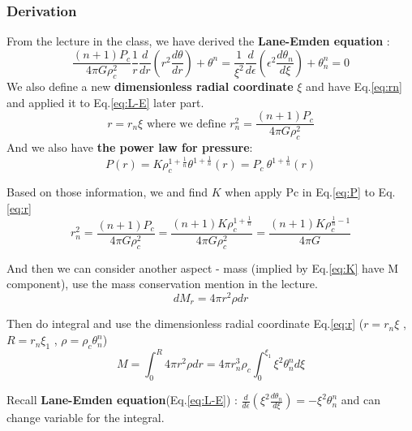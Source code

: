 \documentclass{article}
\begin{document}
\hrulefill %
\subsubsection*{Derivation}

From the lecture in the class, we have derived the \textbf{Lane-Emden equation} :\\
\begin{equation}
    \frac{(n+1)P_c}{4\pi G\rho_c^2}
    \frac{1}{r}\frac{d}{dr}
    (r^2\frac{d\theta}{dr})+\theta^n
    =
    \frac{1}{\xi^2}\frac{d}{d\epsilon }(\epsilon^2\frac{d\theta_n}{d\xi})
    +\theta_n^n=0
    \label{eq:L-E}
\end{equation}
We also define a new \textbf{dimensionless radial coordinate} $\xi$ and have Eq.\ref{eq:rn} and applied it to Eq.\ref{eq:L-E} later part.\\
\begin{equation}
    r=r_n\xi
    \mbox{ where we define }
    r_n^2=\frac{(n+1)P_c}{4\pi G\rho_c^2}
    \label{eq:r}
\end{equation}
And we also have \textbf{the power law for pressure}:
\begin{equation}
    P(r)=K\rho_c ^{1+\frac{1}{n}}\theta^{1+\frac{1}{n}}(r)
    =P_c\ \theta^{1+\frac{1}{n}}(r)
    \label{eq:P}
\end{equation}

Based on those information, we and find $K$ when apply Pc in Eq.\ref{eq:P} to Eq.\ref{eq:r}
\begin{equation}
    r_n^2=\frac{(n+1)P_c}{4\pi G\rho_c^2}
    =\frac{(n+1)K\rho_c^{1+\frac{1}{n}}}{4\pi G\rho_c^2}
    =\frac{(n+1)K\rho_c^{\frac{1}{n}-1}}{4\pi G}
    \label{eq:rn}
\end{equation}

And then we can consider another aspect - mass (implied by Eq.\ref{eq:K} have M component), use the mass conservation mention in the lecture.
\begin{equation*}
    dM_r=4\pi r^2 \rho dr
\end{equation*}

Then do integral and use the dimensionless radial coordinate Eq.\ref{eq:r} ($r=r_n\xi$ , $R=r_n\xi_1$ , $\rho=\rho_c\theta_n^n$)
$$
M=\int_{0}^{R}4\pi r^2 \rho dr
=4\pi r_n^3\rho_c\int_{0}^{\xi_1}\xi^2\theta_n^nd\xi
$$

Recall \textbf{Lane-Emden equation}(Eq.\ref{eq:L-E}) : $\frac{d}{d\epsilon }(\xi^2\frac{d\theta_n}{d\xi})=-\xi^2\theta_n^n$ and can change variable for the integral.
\end{document}
